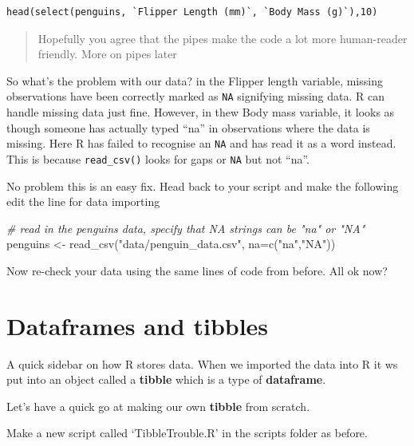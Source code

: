 \documentclass[
]{book}
\newenvironment{Shaded}{\begin{snugshade}}{\end{snugshade}}
\newcommand{\AttributeTok}[1]{\textcolor[rgb]{0.77,0.63,0.00}{#1}}
\newcommand{\CommentTok}[1]{\textcolor[rgb]{0.56,0.35,0.01}{\textit{#1}}}
\newcommand{\FunctionTok}[1]{\textcolor[rgb]{0.00,0.00,0.00}{#1}}
\newcommand{\NormalTok}[1]{#1}
\newcommand{\OtherTok}[1]{\textcolor[rgb]{0.56,0.35,0.01}{#1}}
\newcommand{\StringTok}[1]{\textcolor[rgb]{0.31,0.60,0.02}{#1}}
\begin{document}
\begin{verbatim}
head(select(penguins, `Flipper Length (mm)`, `Body Mass (g)`),10)
\end{verbatim}

\begin{quote}
Hopefully you agree that the pipes make the code a lot more human-reader friendly. More on pipes later
\end{quote}

So what's the problem with our data? in the Flipper length variable, missing observations have been correctly marked as \texttt{NA} signifying missing data. R can handle missing data just fine. However, in thew Body mass variable, it looks as though someone has actually typed ``na'' in observations where the data is missing. Here R has failed to recognise an \texttt{NA} and has read it as a word instead. This is because \texttt{read\_csv()} looks for gaps or \texttt{NA} but not ``na''.

No problem this is an easy fix. Head back to your script and make the following edit the line for data importing

\begin{Shaded}
\begin{Highlighting}[]
\CommentTok{\# read in the penguins data, specify that NA strings can be "na" or "NA"}
\NormalTok{penguins }\OtherTok{\textless{}{-}} \FunctionTok{read\_csv}\NormalTok{(}\StringTok{"data/penguin\_data.csv"}\NormalTok{, }\AttributeTok{na=}\FunctionTok{c}\NormalTok{(}\StringTok{"na"}\NormalTok{,}\StringTok{"NA"}\NormalTok{))}
\end{Highlighting}
\end{Shaded}

Now re-check your data using the same lines of code from before.
All ok now?

\hypertarget{dataframes-and-tibbles}{%
\section{Dataframes and tibbles}\label{dataframes-and-tibbles}}

A quick sidebar on how R stores data. When we imported the data into R it ws put into an object called a \textbf{tibble} which is a type of \textbf{dataframe}.

Let's have a quick go at making our own \textbf{tibble} from scratch.

Make a new script called `TibbleTrouble.R' in the scripts folder as before.
\end{document}
